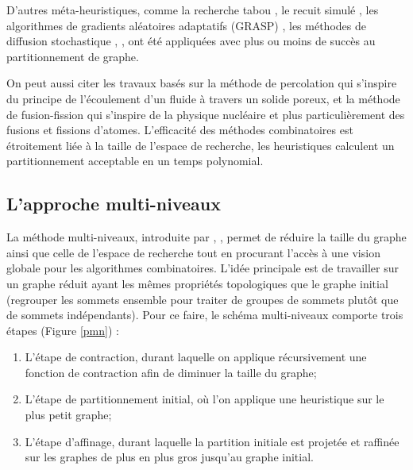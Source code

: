 D'autres méta-heuristiques, comme la recherche tabou \citep{BattitiBertossi1999}, le recuit simulé \citep{Bichot2004,Johnson1989,Williams1991}, les algorithmes de gradients aléatoires adaptatifs (GRASP) \citep{AreibiYang2004}, les méthodes de diffusion stochastique \citep{TaoZhao1993}, \citep{Wan2005}, ont été appliquées avec plus ou moins de succès au partitionnement de graphe.

On peut aussi citer les travaux basés sur la méthode de percolation \citep{MeyerhenkeSchamberger2006,Pellegrini2007} qui s'inspire du principe de l'écoulement d'un fluide à travers un solide poreux, et la méthode de fusion-fission \citep{Bichot2007} qui s'inspire de la physique nucléaire et plus particulièrement des fusions et fissions d'atomes.
L'efficacité des méthodes combinatoires est étroitement liée à la taille de l'espace de recherche, les heuristiques calculent un partitionnement acceptable en un temps polynomial.


\subsection*{L'approche multi-niveaux}
La méthode multi-niveaux, introduite par \citep{BarnardSimon1994,HendricksonLeland1995b}, \citep{VanDriesscheRoose1994}, permet de réduire la taille du graphe ainsi que celle de l'espace de recherche tout en procurant l'accès à une vision globale pour les algorithmes
combinatoires. L'idée principale est de travailler sur un graphe réduit ayant les mêmes propriétés topologiques que le graphe initial (regrouper les sommets ensemble pour traiter de groupes de sommets plutôt que de sommets indépendants).
Pour ce faire, le schéma multi-niveaux comporte trois étapes (Figure \ref{pmn}) :
\begin{enumerate}
	\item  L'étape de contraction, durant laquelle on applique récursivement une fonction de contraction afin de diminuer la taille du graphe;
	\item  L'étape de partitionnement initial, où l'on applique une heuristique sur le plus petit graphe;
	\item  L'étape d'affinage, durant laquelle la partition initiale est projetée et raffinée sur les graphes de plus en plus gros jusqu'au graphe initial.
\end{enumerate}
  
